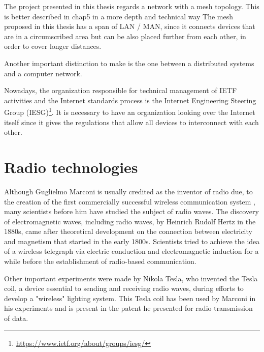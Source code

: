 	The project presented in this thesis regards a network with a mesh topology.
	This is better described in chap5 in a more depth and technical way
	The mesh proposed in this thesis has a span of LAN / MAN, since it connects devices that are in a circumscribed area but can be also placed further from each other, in order to cover longer distances.
	
	Another important distinction to make is the one between a distributed systems and a computer network.
	
	Nowadays, the organization responsible for technical management of IETF activities and the Internet standards process is the Internet Engineering Steering Group (IESG)\footnote{\url{https://www.ietf.org/about/groups/iesg/}}.
	It is necessary to have an organization looking over the Internet itself since it gives the regulations that allow all devices to interconnect with each other.

\section{Radio technologies}\label{sec:radio_tech}
	
	Although Guglielmo Marconi is usually credited as the inventor of radio due, to the creation of the first commercially successful wireless communication system \cite{4137304}, many scientists before him have studied the subject of radio waves.
	The discovery of electromagnetic waves, including radio waves, by Heinrich Rudolf Hertz in the 1880s, came after theoretical development on the connection between electricity and magnetism that started in the early 1800s.
	Scientists tried to achieve the idea of a wireless telegraph via electric conduction and electromagnetic induction for a while before the establishment of radio-based communication.
	
	Other important experiments were made by Nikola Tesla, who invented the Tesla coil, a device essential to sending and receiving radio waves, during efforts to develop a "wireless" lighting system.
	This Tesla coil has been used by Marconi in his experiments and is present in the patent he presented for radio transmission of data.
	
